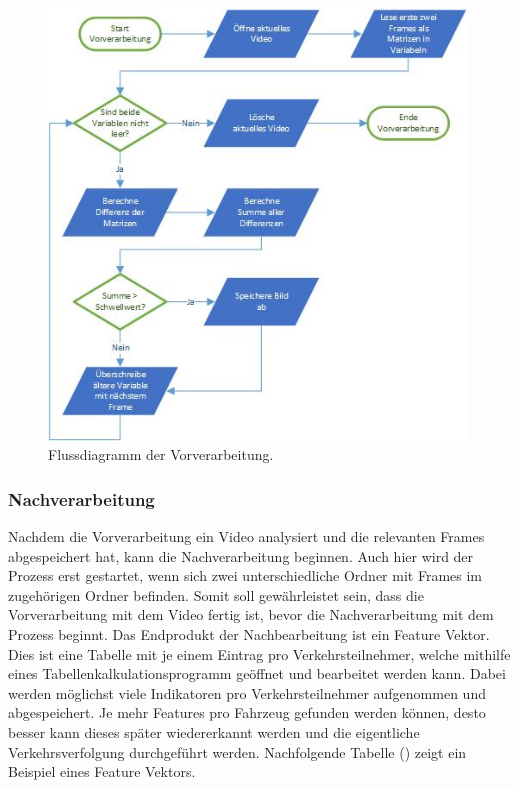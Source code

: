 \begin{figure}[H]
  \centering
  \includegraphics[width=0.99\textwidth]{Software/Fluss_Vorverarbeitung.jpg} 
  \caption{Flussdiagramm der Vorverarbeitung.}
  \label{bFlussVor}
\end{figure}

\subsubsection{Nachverarbeitung}
Nachdem die Vorverarbeitung ein Video analysiert und die relevanten Frames abgespeichert hat, kann die Nachverarbeitung beginnen. Auch hier wird der Prozess erst gestartet, wenn sich zwei unterschiedliche Ordner mit Frames im zugehörigen Ordner befinden. Somit soll gewährleistet sein, dass die Vorverarbeitung mit dem Video fertig ist, bevor die Nachverarbeitung mit dem Prozess beginnt. Das Endprodukt der Nachbearbeitung ist ein Feature Vektor. Dies ist eine Tabelle mit je einem Eintrag pro Verkehrsteilnehmer, welche mithilfe eines Tabellenkalkulationsprogramm geöffnet und bearbeitet werden kann. Dabei werden möglichst viele Indikatoren pro Verkehrsteilnehmer aufgenommen und abgespeichert. Je mehr Features pro Fahrzeug gefunden werden können, desto besser kann dieses später wiedererkannt werden und die eigentliche Verkehrsverfolgung durchgeführt werden. Nachfolgende Tabelle () zeigt ein Beispiel eines Feature Vektors.


